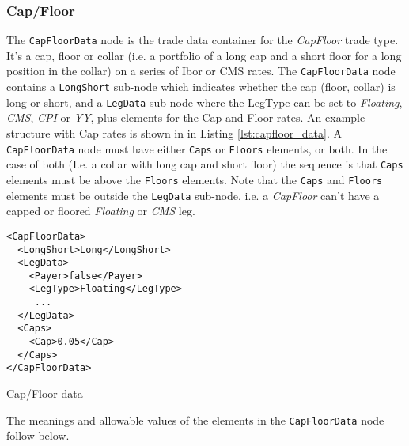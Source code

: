 \subsubsection{Cap/Floor}

The \lstinline!CapFloorData! node is the trade data container for the \emph{CapFloor} trade type.  It's a cap, floor or collar
(i.e. a portfolio of a long cap and a short floor for a long position in the collar) on a series of Ibor or CMS rates. The
\lstinline!CapFloorData! node contains a \lstinline!LongShort! sub-node which indicates whether the cap (floor, collar)
is long or short, and a \lstinline!LegData!  sub-node where the
LegType can be set to \emph{Floating}, \emph{CMS}, \emph{CPI}
or \emph{YY}, plus elements for the Cap and Floor rates. An example structure with Cap rates is shown in in Listing
\ref{lst:capfloor_data}. A \lstinline!CapFloorData! node must have either \lstinline!Caps! or \lstinline!Floors!
elements, or both. In the case of both (I.e. a collar with long cap and short floor) the sequence is that  \lstinline!Caps! elements must be above the \lstinline!Floors! elements. Note that 
the \lstinline!Caps! and \lstinline!Floors! elements must be outside the \lstinline!LegData! sub-node, i.e. a \emph{CapFloor} 
can't have a capped or floored  \emph{Floating}  or \emph{CMS} leg.

\begin{listing}[H]
\begin{verbatim}
<CapFloorData>
  <LongShort>Long</LongShort>
  <LegData>
    <Payer>false</Payer>
    <LegType>Floating</LegType>
     ...
  </LegData>
  <Caps>
    <Cap>0.05</Cap>
  </Caps>
</CapFloorData>
\end{verbatim}
\caption{Cap/Floor data}
\label{lst:capfloor_data}
\end{listing}

The meanings and allowable values of the elements in the \lstinline!CapFloorData!  node follow below.

